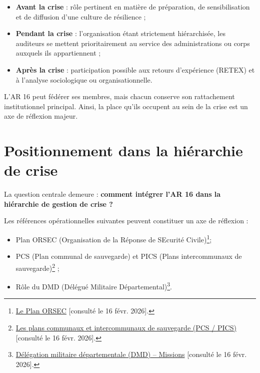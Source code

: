 \documentclass[12pt,a4paper]{article}
\begin{document}
\begin{itemize}
    \item \textbf{Avant la crise} : rôle pertinent en matière de préparation, de sensibilisation et de diffusion d'une culture de résilience ;
    \item \textbf{Pendant la crise} : l'organisation étant strictement hiérarchisée, les auditeurs se mettent prioritairement au service des administrations ou corps auxquels ils appartiennent ;
    \item \textbf{Après la crise} : participation possible aux retours d'expérience (RETEX) et à l'analyse sociologique ou organisationnelle.
\end{itemize}

L'AR 16 peut fédérer ses membres, mais chacun conserve son rattachement institutionnel principal. Ainsi, la place qu'ils occupent au sein de la crise est un axe de réflexion majeur.

\section*{Positionnement dans la hiérarchie de crise}

La question centrale demeure : \textbf{comment intégrer l'AR 16 dans la hiérarchie de gestion de crise ?}

Les références opérationnelles suivantes peuvent constituer un axe de réflexion :
\begin{itemize}
    \item Plan ORSEC (Organisation de la Réponse de SEcurité Civile)\footnote{\href{https://www.hauts-de-seine.gouv.fr/Actions-de-l-Etat/Securite-et-Defense/Securite-civile/Le-Plan-ORSEC}{Le Plan ORSEC} [consulté le 16 févr. 2026].};
    \item PCS (Plan communal de sauvegarde) et PICS (Plans intercommunaux de sauvegarde)\footnote{\href{https://www.securite-civile.interieur.gouv.fr/reagir/comment-se-preparer-face-aux-risques/plans-communaux-et}{Les plans communaux et intercommunaux de sauvegarde (PCS / PICS)} [consulté le 16 févr. 2026].} ;
    \item Rôle du DMD (Délégué Militaire Départemental)\footnote{\href{https://www.eure.gouv.fr/Services-de-l-Etat/Defense-memoire-anciens-combattants/Delegation-militaire-departementale-DMD2/MISSIONS}{Délégation militaire départementale (DMD) -- Missions} [consulté le 16 févr. 2026].}.
\end{itemize}

\end{document}
